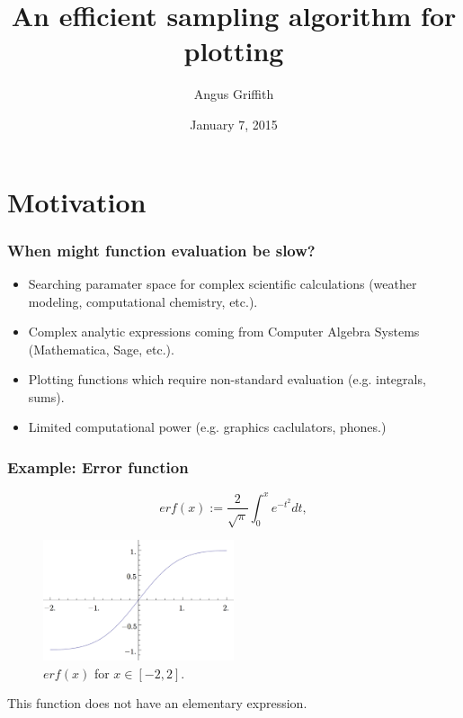 \documentclass{beamer}
\title{An efficient sampling algorithm for plotting}
\author{Angus Griffith}
\date{January 7, 2015}
\begin{document}
\begin{frame}
\titlepage
\end{frame}

\section{Motivation}
\begin{frame}
\frametitle{When might function evaluation be slow?}
\begin{itemize}
\item
Searching paramater space for complex scientific calculations (weather modeling, computational chemistry, etc.).
\item
Complex analytic expressions coming from Computer Algebra Systems (Mathematica, Sage, etc.).
\item
Plotting functions which require non-standard evaluation (e.g. integrals, sums).
\item
Limited computational power (e.g. graphics caclulators, phones.)
\end{itemize}
\end{frame}

\begin{frame}
\frametitle{Example: Error function}
\[
erf(x) := \frac{2}{\sqrt{\pi}} \int_0^x e^{-t^2} dt,
\]
\begin{figure}
\includegraphics[width=0.5\textwidth]{erfx.png}
\caption{$erf(x)$ for $x \in [-2, 2]$.}
\end{figure}
This function does not have an elementary expression.
\end{frame}
\end{document}
